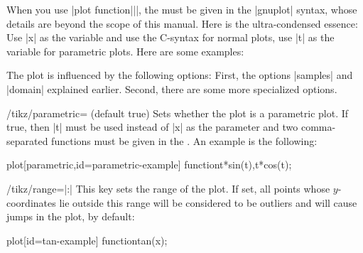 When you use |plot function{||}|, the  must be given in the |gnuplot| syntax, whose details are beyond the
scope of this manual. Here is the ultra-condensed essence: Use |x| as the
variable and use the C-syntax for normal plots, use |t| as the variable for
parametric plots. Here are some examples:
%
\begin{codeexample}[]
\end{codeexample}

The plot is influenced by the following options: First, the options |samples|
and |domain| explained earlier. Second, there are some more specialized
options.

\begin{key}{/tikz/parametric= (default true)}
    Sets whether the plot is a parametric plot. If true, then |t| must be used
    instead of |x| as the parameter and two comma-separated functions must be
    given in the . An example is the following:
\begin{codeexample}[]
\tikz \draw[scale=0.5,domain=-3.141:3.141,smooth]
  plot[parametric,id=parametric-example] function{t*sin(t),t*cos(t)};
\end{codeexample}
\end{key}

\begin{key}{/tikz/range=|:|}
    This key sets the range of the plot. If set, all points whose
    $y$-coordinates lie outside this range will be considered to be outliers
    and will cause jumps in the plot, by default:
\begin{codeexample}[]
\tikz \draw[scale=0.5,domain=-3.141:3.141, samples=100, smooth, range=-3:3]
  plot[id=tan-example] function{tan(x)};
\end{codeexample}
\end{key}

